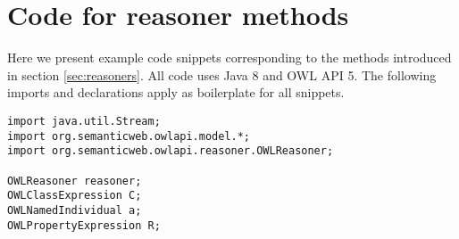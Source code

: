 \documentclass[paper.tex]{subfiles}
\begin{document}
\section{Code for reasoner methods}
\label{app:code}

\newlength{\currentparindent}
\setlength{\currentparindent}{\parindent}
\noindent
\begin{minipage}[t]{\dimexpr.5\textwidth-.5\columnsep}
\setlength{\parindent}{\currentparindent}

Here we present example code snippets corresponding to the methods introduced in section \ref{sec:reasoners}.  All code uses Java 8 and OWL API 5.  The following imports and declarations apply as boilerplate for all snippets.

\end{minipage}

\bigskip

\noindent
\begin{verbatim}
import java.util.Stream;
import org.semanticweb.owlapi.model.*;
import org.semanticweb.owlapi.reasoner.OWLReasoner;

OWLReasoner reasoner;
OWLClassExpression C;
OWLNamedIndividual a;
OWLPropertyExpression R;
\end{verbatim}

\bigskip
\end{document}
